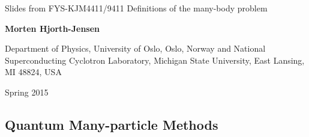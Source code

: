 \documentclass[%
twoside,                 %
final,                   %
10pt]{article}
\begin{document}






\thispagestyle{empty}

\begin{center}
{\LARGE\bf
\begin{spacing}{1.25}
Slides from FYS-KJM4411/9411 Definitions of the many-body problem
\end{spacing}
}
\end{center}


\begin{center}
{\bf Morten Hjorth-Jensen}
\end{center}

    \begin{center}
\centerline{{\small Department of Physics, University of Oslo, Oslo, Norway and National Superconducting Cyclotron Laboratory, Michigan State University, East Lansing, MI 48824, USA}}
\end{center}
    

\begin{center} %
Spring 2015
\end{center}

\vspace{1cm}


\subsection{Quantum Many-particle Methods}

\end{document}
